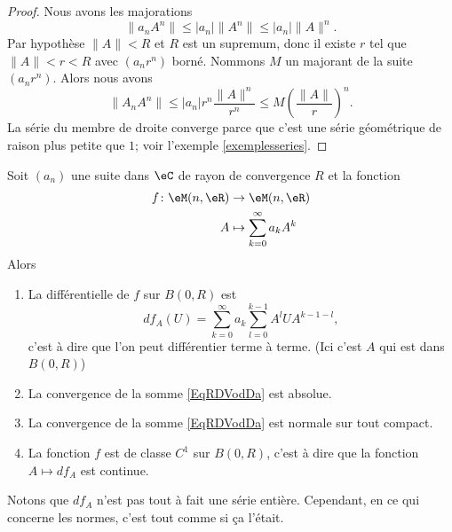 \begin{proof}
    Nous avons les majorations
    \begin{equation}
        \| a_n A^n\|\leq | a_n |\| A^n \|\leq | a_n |\| A \|^n.
    \end{equation}
    Par hypothèse \( \| A \|<R\) et \( R\) est un supremum, donc il existe \( r\) tel que \( \| A \|<r<R\) avec \( (a_nr^n)\) borné. Nommons \( M\) un majorant de la suite \( (a_nr^n)\). Alors nous avons
    \begin{equation}
        \| A_nA^n \|\leq | a_n |r^n\frac{ \| A \|^n }{ r^n }\leq M\left( \frac{ \| A \| }{ r } \right)^n.
    \end{equation}
    La série du membre de droite converge parce que c'est une série géométrique de raison plus petite que \( 1\); voir l'exemple \ref{exemplesseries}.
\end{proof}

\begin{proposition} \label{PropAMBXKgV}
    Soit \( (a_n)\) une suite dans \( \eC\) de rayon de convergence \( R\) et la fonction
    \begin{equation}
        \begin{aligned}
            f\colon \eM(n,\eR)&\to \eM(n,\eR) \\
            A&\mapsto \sum_{k=0}^{\infty}a_kA^k 
        \end{aligned}
    \end{equation}
    Alors
    \begin{enumerate}
        \item
            La différentielle de \( f\) sur \( B(0,R)\) est
            \begin{equation}    \label{EqRDVodDa}
                df_A(U)=\sum_{k=0}^{\infty}a_k\sum_{l=0}^{k-1}A^lUA^{k-1-l},
            \end{equation}
            c'est à dire que l'on peut différentier terme à terme. (Ici c'est \( A\) qui est dans \( B(0,R)\))
        \item
            La convergence de la somme \ref{EqRDVodDa} est absolue.
        \item
            La convergence de la somme \ref{EqRDVodDa} est normale sur tout compact.
        \item
            La fonction \( f\) est de classe \( C^1\) sur \( B(0,R)\), c'est à dire que la fonction \( A\mapsto df_A\) est continue.
    \end{enumerate}
\end{proposition}
Notons que \( df_A\) n'est pas tout à fait une série entière. Cependant, en ce qui concerne les normes, c'est tout comme si ça l'était.

